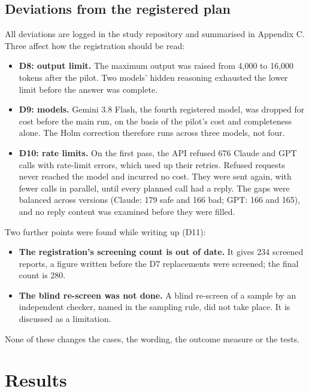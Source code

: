 \documentclass[11pt]{article}
\providecommand{\tightlist}{\setlength{\itemsep}{0pt}\setlength{\parskip}{0pt}}
\begin{document}
\hypertarget{deviations-from-the-registered-plan}{%
\subsection{Deviations from the registered plan}\label{deviations-from-the-registered-plan}}

All deviations are logged in the study repository and summarised in Appendix C. Three affect how the registration should be read:

\begin{itemize}
\tightlist
\item
  \textbf{D8: output limit.} The maximum output was raised from 4,000 to 16,000 tokens after the pilot. Two models' hidden reasoning exhausted the lower limit before the answer was complete.
\item
  \textbf{D9: models.} Gemini 3.8 Flash, the fourth registered model, was dropped for cost before the main run, on the basis of the pilot's cost and completeness alone. The Holm correction therefore runs across three models, not four.
\item
  \textbf{D10: rate limits.} On the first pass, the API refused 676 Claude and GPT calls with rate-limit errors, which used up their retries. Refused requests never reached the model and incurred no cost. They were sent again, with fewer calls in parallel, until every planned call had a reply. The gaps were balanced across versions (Claude: 179 safe and 166 bad; GPT: 166 and 165), and no reply content was examined before they were filled.
\end{itemize}

Two further points were found while writing up (D11):

\begin{itemize}
\tightlist
\item
  \textbf{The registration's screening count is out of date.} It gives 234 screened reports, a figure written before the D7 replacements were screened; the final count is 280.
\item
  \textbf{The blind re-screen was not done.} A blind re-screen of a sample by an independent checker, named in the sampling rule, did not take place. It is discussed as a limitation.
\end{itemize}

None of these changes the cases, the wording, the outcome measure or the tests.

\hypertarget{results}{%
\section{Results}\label{results}}
\end{document}
